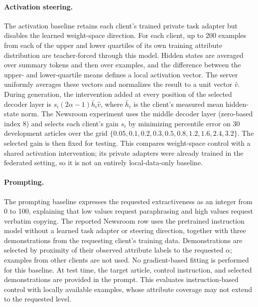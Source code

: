 \documentclass[11pt]{article}
\begin{document}
\paragraph{Activation steering.}
The activation baseline retains each client's trained private task adapter but disables the learned weight-space direction. For each client, up to 200 examples from each of the upper and lower quartiles of its own training attribute distribution are teacher-forced through this model. Hidden states are averaged over summary tokens and then over examples, and the difference between the upper- and lower-quartile means defines a local activation vector. The server uniformly averages these vectors and normalizes the result to a unit vector $\widehat v$. During generation, the intervention added at every position of the selected decoder layer is $s_i(2\alpha-1)\bar h_i\widehat v$, where $\bar h_i$ is the client's measured mean hidden-state norm. The Newsroom experiment uses the middle decoder layer (zero-based index 8) and selects each client's gain $s_i$ by minimizing percentile error on 30 development articles over the grid $\{0.05,0.1,0.2,0.3,0.5,0.8,1.2,1.6,2.4,3.2\}$. The selected gain is then fixed for testing. This compares weight-space control with a shared activation intervention; its private adapters were already trained in the federated setting, so it is not an entirely local-data-only baseline.

\paragraph{Prompting.}
The prompting baseline expresses the requested extractiveness as an integer from 0 to 100, explaining that low values request paraphrasing and high values request verbatim copying. The reported Newsroom row uses the pretrained instruction model without a learned task adapter or steering direction, together with three demonstrations from the requesting client's training data. Demonstrations are selected by proximity of their observed attribute labels to the requested $\alpha$; examples from other clients are not used. No gradient-based fitting is performed for this baseline. At test time, the target article, control instruction, and selected demonstrations are provided in the prompt. This evaluates instruction-based control with locally available examples, whose attribute coverage may not extend to the requested level.
\end{document}
